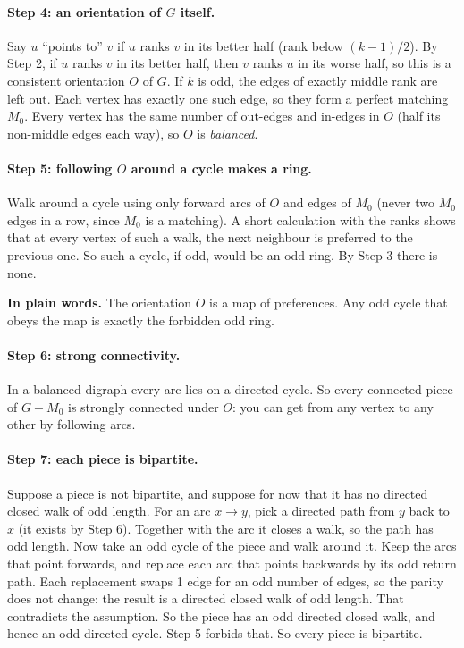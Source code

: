 \documentclass[11pt]{article}
\theoremstyle{plain}
\theoremstyle{definition}
\newcommand{\plain}[1]{\par\smallskip\noindent\colorbox{black!6}{\parbox{\dimexpr\linewidth-2\fboxsep}{\small\textbf{In plain words.} #1}}\par\smallskip}
\begin{document}
\paragraph{Step 4: an orientation of $G$ itself.} Say $u$ ``points to'' $v$ if $u$ ranks $v$ in
its better half (rank below $(k-1)/2$). By Step 2, if $u$ ranks $v$ in its better half, then
$v$ ranks $u$ in its worse half, so this is a consistent orientation $O$ of $G$. If $k$ is odd,
the edges of exactly middle rank are left out. Each vertex has exactly one such edge, so they
form a perfect matching $M_0$. Every vertex has the same number of out-edges and in-edges in
$O$ (half its non-middle edges each way), so $O$ is \emph{balanced}.

\paragraph{Step 5: following $O$ around a cycle makes a ring.} Walk around a cycle using only
forward arcs of $O$ and edges of $M_0$ (never two $M_0$ edges in a row, since $M_0$ is a
matching). A short calculation with the ranks shows that at every vertex of such a walk, the
next neighbour is preferred to the previous one. So such a cycle, if odd, would be an odd ring.
By Step 3 there is none.

\plain{The orientation $O$ is a map of preferences. Any odd cycle that obeys the map is
exactly the forbidden odd ring.}

\paragraph{Step 6: strong connectivity.} In a balanced digraph every arc lies on a directed
cycle. So every connected piece of $G - M_0$ is strongly connected under $O$: you can get from
any vertex to any other by following arcs.

\paragraph{Step 7: each piece is bipartite.} Suppose a piece is not bipartite, and suppose
for now that it has no directed closed walk of odd length. For an arc $x \to y$, pick a directed
path from $y$ back to $x$ (it exists by Step 6). Together with the arc it closes a walk, so the
path has odd length. Now take an odd cycle of the piece and walk around it. Keep the arcs that
point forwards, and replace each arc that points backwards by its odd return path. Each
replacement swaps 1 edge for an odd number of edges, so the parity does not change: the result
is a directed closed walk of odd length. That contradicts the assumption. So the piece has an
odd directed closed walk, and hence an odd directed cycle. Step 5 forbids that. So every piece
is bipartite.
\end{document}
